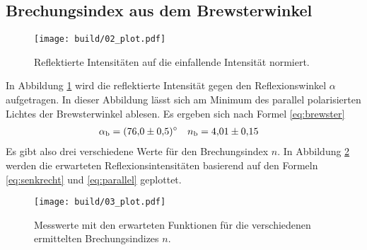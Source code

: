 \subsection{Brechungsindex aus dem Brewsterwinkel}
\begin{figure}
    \centering
    \texttt{[image: build/02\_plot.pdf]}
    \caption{Reflektierte Intensitäten auf die einfallende Intensität normiert.}
    \label{fig:I_r_einfach}
\end{figure}
In Abbildung \ref{fig:I_r_einfach} wird die reflektierte Intensität gegen den Reflexionswinkel $\alpha$ aufgetragen.
In dieser Abbildung lässt sich am Minimum des parallel polarisierten Lichtes der Brewsterwinkel ablesen.
Es ergeben sich nach Formel \eqref{eq:brewster}
\begin{align}
    \alpha_\text{b} &= \qty{76 \pm 0.5}{\degree} & n_\text{b} &= \num{4.01 \pm 0.15}
\end{align}
Es gibt also drei verschiedene Werte für den Brechungsindex $n$.
In Abbildung \ref{fig:I_r_kompliziert} werden die erwarteten Reflexionsintensitäten basierend auf den Formeln \eqref{eq:senkrecht} und 
\eqref{eq:parallel} geplottet.
\begin{figure}
    \centering
    \texttt{[image: build/03\_plot.pdf]}
    \caption{Messwerte mit den erwarteten Funktionen für die verschiedenen ermittelten Brechungsindizes $n$.}
    \label{fig:I_r_kompliziert}
\end{figure}